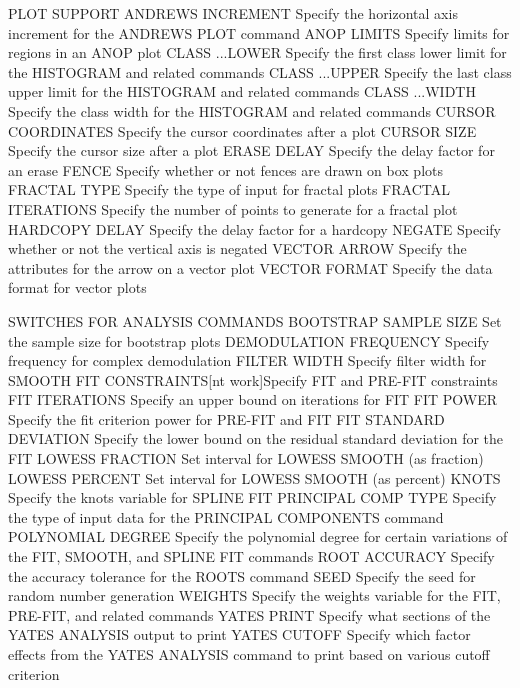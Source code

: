 PLOT SUPPORT
   ANDREWS INCREMENT       Specify the horizontal axis increment for
                           the ANDREWS PLOT command
   ANOP LIMITS             Specify limits for regions in an ANOP plot
   CLASS ...LOWER          Specify the  first class lower limit for
                           the HISTOGRAM and related commands
   CLASS ...UPPER          Specify the last class upper limit for
                           the HISTOGRAM and related commands
   CLASS ...WIDTH          Specify the class width for the HISTOGRAM
                           and related commands
   CURSOR COORDINATES      Specify the cursor coordinates after a plot
   CURSOR SIZE             Specify the cursor size after a plot
   ERASE DELAY             Specify the delay factor for an erase
   FENCE                   Specify whether or not fences are drawn on
                           box plots
   FRACTAL TYPE            Specify the type of input for fractal plots
   FRACTAL ITERATIONS      Specify the number of points to generate for
                           a fractal plot
   HARDCOPY DELAY          Specify the delay factor for a hardcopy
   NEGATE                  Specify whether or not the vertical axis is
                           negated
   VECTOR ARROW            Specify the attributes for the arrow on a
                           vector plot
   VECTOR FORMAT           Specify the data format for vector plots
 
SWITCHES FOR ANALYSIS COMMANDS
   BOOTSTRAP SAMPLE SIZE   Set the sample size for bootstrap plots
   DEMODULATION FREQUENCY  Specify frequency for complex demodulation
   FILTER WIDTH            Specify filter width for SMOOTH
   FIT CONSTRAINTS[nt work]Specify FIT and PRE-FIT constraints
   FIT ITERATIONS          Specify an upper bound on iterations for FIT
   FIT POWER               Specify the fit criterion power for PRE-FIT
                           and FIT
   FIT STANDARD DEVIATION  Specify the lower bound on the residual
                           standard deviation for the FIT
   LOWESS FRACTION         Set interval for LOWESS SMOOTH (as fraction)
   LOWESS PERCENT          Set interval for LOWESS SMOOTH (as percent)
   KNOTS                   Specify the knots variable for SPLINE FIT
   PRINCIPAL COMP TYPE     Specify the type of input data for the
                           PRINCIPAL COMPONENTS command
   POLYNOMIAL DEGREE       Specify the polynomial degree for certain
                           variations of the FIT, SMOOTH, and SPLINE
                           FIT commands
   ROOT ACCURACY           Specify the accuracy tolerance for the
                           ROOTS command
   SEED                    Specify the seed for random number
                           generation
   WEIGHTS                 Specify the weights variable for the FIT,
                           PRE-FIT, and related commands
   YATES PRINT             Specify what sections of the YATES ANALYSIS
                           output to print
   YATES CUTOFF            Specify which factor effects from the YATES
                           ANALYSIS command to print based on various
                           cutoff criterion
 
